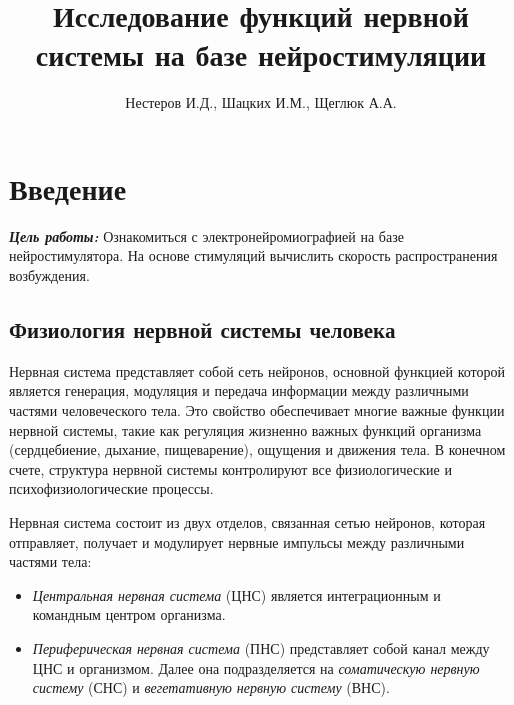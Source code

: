 \documentclass{article}
\title{Исследование функций нервной системы на базе нейростимуляции}
\author{Нестеров И.Д., Шацких И.М., Щеглюк А.А.}
\date{}
\begin{document}
    \maketitle
    \tableofcontents
    \newpage

    \section*{Введение}

        \hspace*{4mm}\textbf{\textit{Цель работы:}} Ознакомиться с электронейромиографией на базе нейростимулятора.
        На основе стимуляций вычислить скорость распространения возбуждения. 

        \subsection*{Физиология нервной системы человека}

        \hspace*{4mm} Нервная система представляет собой сеть нейронов, основной функцией
        которой является генерация, модуляция и передача информации между
        различными частями человеческого тела. Это свойство обеспечивает многие
        важные функции нервной системы, такие как регуляция жизненно важных
        функций организма (сердцебиение, дыхание, пищеварение), ощущения и
        движения тела. В конечном счете, структура нервной системы контролируют
        все физиологические и психофизиологические процессы.
        \vspace*{4mm}

        Нервная система состоит из двух отделов, связанная сетью нейронов,
        которая отправляет, получает и модулирует нервные импульсы между
        различными частями тела:

        \begin{itemize}
            \item \textit{Центральная нервная система} (ЦНС) является интеграционным и
            командным центром организма.

            \item \textit{Периферическая нервная система} (ПНС) представляет собой канал
            между ЦНС и организмом. Далее она подразделяется на \textit{соматическую
            нервную систему} (СНС) и \textit{вегетативную нервную систему} (ВНС).
        \end{itemize}
\end{document}
